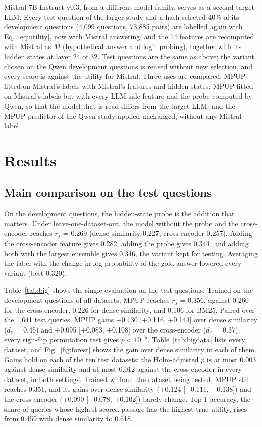 \documentclass[preprint,12pt,authoryear]{elsarticle}
\begin{document}
Mistral-7B-Instruct-v0.3, from a different model family, serves as a second target LLM. Every test question of the larger study and a hash-selected 40\% of its development questions (4,099 questions, 73,885 pairs) are labelled again with Eq.~\eqref{eq:utility}, now with Mistral answering, and the 14 features are recomputed with Mistral as $M$ (hypothetical answer and logit probing), together with its hidden states at layer 24 of 32. Test questions are the same as above; the variant chosen on the Qwen development questions is reused without new selection, and every score is against the utility for Mistral. Three uses are compared: MPUP fitted on Mistral's labels with Mistral's features and hidden states; MPUP fitted on Mistral's labels but with every LLM-side feature and the probe computed by Qwen, so that the model that is read differs from the target LLM; and the MPUP predictor of the Qwen study applied unchanged, without any Mistral label.

\section{Results}\label{sec:results}
\subsection{Main comparison on the test questions}\label{sec:bigres}
On the development questions, the hidden-state probe is the addition that matters. Under leave-one-dataset-out, the model without the probe and the cross-encoder reaches $r_s$ = 0.269 (dense similarity 0.227, cross-encoder 0.257). Adding the cross-encoder feature gives 0.282, adding the probe gives 0.344, and adding both with the largest ensemble gives 0.346, the variant kept for testing. Averaging the label with the change in log-probability of the gold answer lowered every variant (best 0.320).

Table~\ref{tab:big} shows the single evaluation on the test questions. Trained on the development questions of all datasets, MPUP reaches $r_s$ = 0.356, against 0.260 for the cross-encoder, 0.226 for dense similarity, and 0.106 for BM25. Paired over the 1,641 test queries, MPUP gains +0.130 [+0.116, +0.144] over dense similarity ($d_z$ = 0.45) and +0.095 [+0.083, +0.108] over the cross-encoder ($d_z$ = 0.37); every sign-flip permutation test gives $p < 10^{-5}$. Table~\ref{tab:bigdata} lists every dataset, and Fig.~\ref{fig:forest} shows the gain over dense similarity in each of them. Gains hold on each of the ten test datasets: the Holm-adjusted $p$ is at most 0.003 against dense similarity and at most 0.012 against the cross-encoder in every dataset, in both settings. Trained without the dataset being tested, MPUP still reaches 0.351, and its gains over dense similarity (+0.124 [+0.111, +0.138]) and the cross-encoder (+0.090 [+0.078, +0.102]) barely change. Top-1 accuracy, the share of queries whose highest-scored passage has the highest true utility, rises from 0.459 with dense similarity to 0.618.
\end{document}
